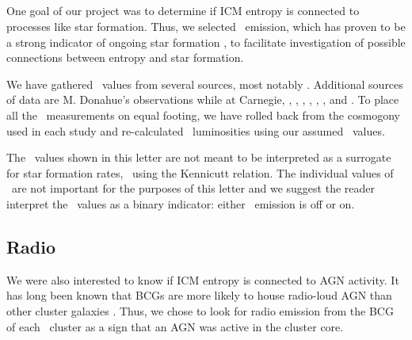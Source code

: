 \documentclass{emulateapj}
\begin{document}
\subsection{\halpha}
\label{sec:ha}

One goal of our project was to determine if ICM entropy is connected
to processes like star formation. Thus, we selected \halpha\ emission,
which has proven to be a strong indicator of ongoing star formation
\citep{kennicuttrelation}, to facilitate investigation of possible
connections between entropy and star formation.

We have gathered \halpha\ values from several sources, most notably
\cite{crawford99}. Additional sources of data are M. Donahue's
observations while at Carnegie, \cite{heckman89}, \cite{dsg92},
\cite{lawrence96}, \cite{1996AJ....112.1390V}, \cite{white97},
\cite{2005MNRAS.363..216C}, and \cite{ir_quillen}. To place all the
\halpha\ measurements on equal footing, we have rolled back from the
cosmogony used in each study and re-calculated \halpha\ luminosities
using our assumed \LCDM\ values.

The \lha\ values shown in this letter are not meant to be interpreted
as a surrogate for star formation rates, \eg\ using the Kennicutt
relation. The individual values of \lha\ are not important for the
purposes of this letter and we suggest the reader interpret the
\lha\ values as a binary indicator: either \halpha\ emission is off or
on.

\subsection{Radio}
\label{sec:radio}

We were also interested to know if ICM entropy is connected to AGN
activity. It has long been known that BCGs are more likely to house
radio-loud AGN than other cluster galaxies \citep{burns81,
  valentijn83, burns90}. Thus, we chose to look for radio emission
from the BCG of each \accept\ cluster as a sign that an AGN was active
in the cluster core.
\end{document}
